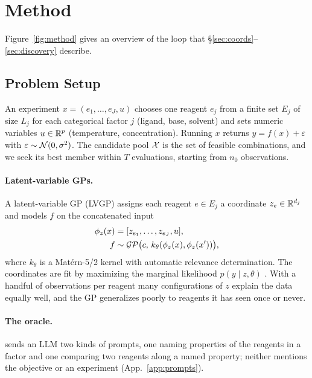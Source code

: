 \section{Method}
\label{sec:method}

Figure~\ref{fig:method} gives an overview of the loop that \S\ref{sec:coords}--\ref{sec:discovery} describe.

\subsection{Problem Setup}
\label{sec:setup}
An experiment $x=(e_1,\dots,e_J,u)$ chooses one reagent $e_j$ from a finite set $E_j$ of size $L_j$ for each categorical factor $j$ (ligand, base, solvent) and sets numeric variables $u\in\mathbb{R}^{p}$ (temperature, concentration). Running $x$ returns $y=f(x)+\varepsilon$ with $\varepsilon\sim\mathcal{N}(0,\sigma^2)$. The candidate pool $\mathcal{X}$ is the set of feasible combinations, and we seek its best member within $T$ evaluations, starting from $n_0$ observations.

\paragraph{Latent-variable GPs.}
A latent-variable GP (LVGP) assigns each reagent $e\in E_j$ a coordinate $z_e\in\mathbb{R}^{d_j}$ and models $f$ on the concatenated input
\begin{equation}
\begin{aligned}
\phi_z(x)&=[z_{e_1},\dots,z_{e_J},u],\\
f&\sim\mathcal{GP}\big(c,\,k_\theta(\phi_z(x),\phi_z(x'))\big),
\end{aligned}
\label{eq:lvgp}
\end{equation}
where $k_\theta$ is a Mat\'ern-5/2 kernel with automatic relevance determination. The coordinates are fit by maximizing the marginal likelihood $p(y\mid z,\theta)$ \citep{zhang2020latent}. With a handful of observations per reagent many configurations of $z$ explain the data equally well, and the GP generalizes poorly to reagents it has seen once or never.

\paragraph{The oracle.}
\ours{} sends an LLM two kinds of prompts, one naming properties of the reagents in a factor and one comparing two reagents along a named property; neither mentions the objective or an experiment (App.~\ref{app:prompts}).

